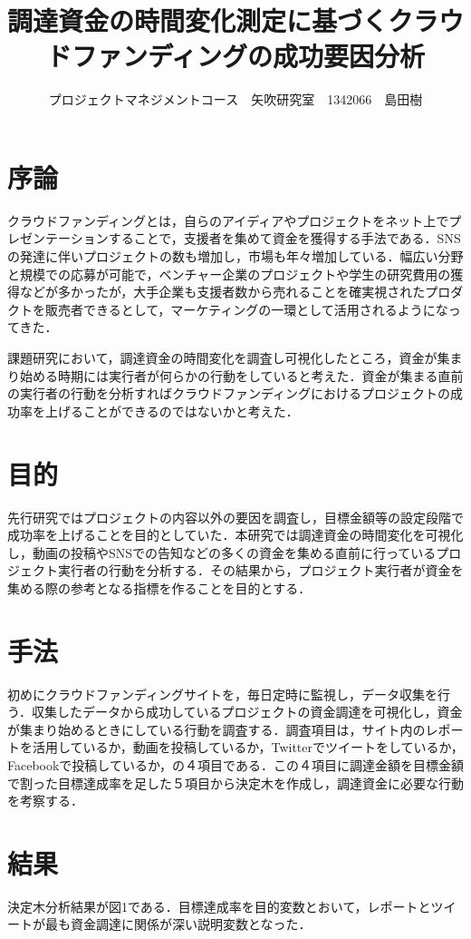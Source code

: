 \documentclass[uplatex,twocolumn,dvipdfmx]{jsarticle}
\title{\vspace{-5mm}\fontsize{14pt}{0pt}\selectfont 調達資金の時間変化測定に基づくクラウドファンディングの成功要因分析}
\author{\normalsize プロジェクトマネジメントコース　矢吹研究室　1342066　島田樹}
\date{}
\begin{document}
\fontsize{10.5pt}{\baselineskip}\selectfont
\maketitle





\section{序論}
クラウドファンディングとは，自らのアイディアやプロジェクトをネット上でプレゼンテーションすることで，支援者を集めて資金を獲得する手法である．SNSの発達に伴いプロジェクトの数も増加し，市場も年々増加している\cite{visualizing}．幅広い分野と規模での応募が可能で，ベンチャー企業のプロジェクトや学生の研究費用の獲得などが多かったが，大手企業も支援者数から売れることを確実視されたプロダクトを販売者できるとして，マーケティングの一環として活用されるようになってきた．

課題研究において，調達資金の時間変化を調査し可視化したところ，資金が集まり始める時期には実行者が何らかの行動をしていると考えた．資金が集まる直前の実行者の行動を分析すればクラウドファンディングにおけるプロジェクトの成功率を上げることができるのではないかと考えた．


\section{目的}
先行研究\cite{miura}ではプロジェクトの内容以外の要因を調査し，目標金額等の設定段階で成功率を上げることを目的としていた．本研究では調達資金の時間変化を可視化し，動画の投稿やSNSでの告知などの多くの資金を集める直前に行っているプロジェクト実行者の行動を分析する．その結果から，プロジェクト実行者が資金を集める際の参考となる指標を作ることを目的とする．


\section{手法}
初めにクラウドファンディングサイトを，毎日定時に監視し，データ収集を行う．収集したデータから成功しているプロジェクトの資金調達を可視化し，資金が集まり始めるときにしている行動を調査する．調査項目は，サイト内のレポートを活用しているか，動画を投稿しているか，Twitterでツイートをしているか，Facebookで投稿しているか，の４項目である．この４項目に調達金額を目標金額で割った目標達成率を足した５項目から決定木を作成し，調達資金に必要な行動を考察する．


\section{結果}
決定木分析結果が図1である．目標達成率を目的変数とおいて，レポートとツイートが最も資金調達に関係が深い説明変数となった．
\end{document}
